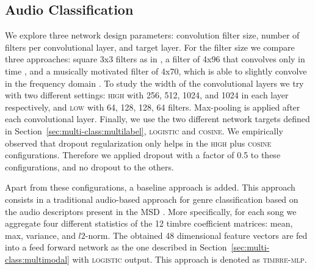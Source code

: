 \subsection{Audio Classification}\label{sec:multi-class:audioexp}

We explore three network design parameters: convolution filter size, number of filters per convolutional layer, and target layer. 
For the filter size we compare three approaches: square 3x3 filters as in \cite{Choi2016}, a filter of 4x96 that convolves only in time \citep{Oord2013}, and a musically motivated filter of 4x70, which is able to slightly convolve in the frequency domain \citep{pons2016experimenting}. 
To study the width of the convolutional layers we try with two different settings: \textsc{high} with 256, 512, 1024, and 1024 in each layer respectively, and \textsc{low} with 64, 128, 128, 64 filters. %
Max-pooling is applied after each convolutional layer.
Finally, we use the two different network targets defined in Section~\ref{sec:multi-class:multilabel}, \textsc{logistic} and \textsc{cosine}. %
We empirically observed that dropout regularization only helps in the \textsc{high} plus \textsc{cosine} configurations. Therefore we applied dropout with a factor of 0.5 to these configurations, and no dropout to the others. %

Apart from these configurations, a baseline approach is added. This approach consists in a traditional audio-based approach for genre classification based on the audio descriptors present in the MSD \citep{Bertin-Mahieux2011}.
More specifically, for each song we aggregate four different statistics of the 12 timbre coefficient matrices: mean, max, variance, and $l2$-norm.
The obtained 48 dimensional feature vectors are fed into a feed forward network as the one described in Section~\ref{sec:multi-class:multimodal} with \textsc{logistic} output.
This approach is denoted as \textsc{timbre-mlp}.

